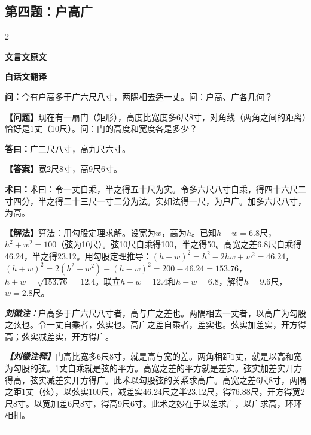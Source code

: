 \documentclass[10pt,a4paper]{article}
\newcommand{\wen}[1]{\textbf{\color{problemcolor}问：}#1\par}
\newcommand{\da}[1]{\textbf{答曰：}#1\par}
\newcommand{\shu}[1]{\textbf{术曰：}#1\par}
\newcommand{\liuhui}[1]{{\color{commentarycolor}\textit{\textbf{刘徽注：}}#1\par}}
\newcommand{\classicalheader}[1]{{\centering\large\bfseries\color{classicalcolor} #1\par\vspace{0.5em}}}
\newcommand{\wenmodern}[1]{\textbf{\color{moderncolor}【问题】}#1\par}
\newcommand{\damodern}[1]{\textbf{【答案】}#1\par}
\newcommand{\shumodern}[1]{\textbf{【解法】}#1\par}
\newcommand{\liuhuimodern}[1]{{\color{commentarycolor}\textit{\textbf{【刘徽注释】}}#1\par}}
\newcommand{\modernheader}[1]{{\centering\large\bfseries\color{moderncolor} #1\par\vspace{0.5em}}}
\newcommand{\problemsec}[1]{\subsection*{#1}}
\begin{document}
\problemsec{第四题：户高广}
\begin{paracol}{2}
\classicalheader{文言文原文}
\switchcolumn
\modernheader{白话文翻译}
\switchcolumn*

\wen{今有户高多于广六尺八寸，两隅相去适一丈。问：户高、广各几何？}

\switchcolumn

\wenmodern{现在有一扇门（矩形），高度比宽度多6尺8寸，对角线（两角之间的距离）恰好是1丈（10尺）。问：门的高度和宽度各是多少？}

\switchcolumn*

\da{广二尺八寸，高九尺六寸。}

\switchcolumn

\damodern{宽2尺8寸，高9尺6寸。}

\switchcolumn*

\shu{术曰：令一丈自乘，半之得五十尺为实。令多六尺八寸自乘，得四十六尺二寸四分，半之得二十三尺一寸二分为法。实如法得一尺，为户广。加多六尺八寸，为高。}

\switchcolumn

\shumodern{算法：用勾股定理求解。设宽为$w$，高为$h$。已知$h-w=6.8$尺，$h^2+w^2=100$（弦为10尺）。弦10尺自乘得100，半之得50。高宽之差6.8尺自乘得46.24，半之得23.12。用勾股定理推导：$(h-w)^2=h^2-2hw+w^2=46.24$，$(h+w)^2=2(h^2+w^2)-(h-w)^2=200-46.24=153.76$，$h+w=\sqrt{153.76}=12.4$。联立$h+w=12.4$和$h-w=6.8$，解得$h=9.6$尺，$w=2.8$尺。}

\switchcolumn*

\liuhui{户高多于广六尺八寸者，高与广之差也。两隅相去一丈者，以高广为勾股之弦也。令一丈自乘者，弦实也。高广之差自乘者，差实也。弦实加差实，开方得高；弦实减差实，开方得广。}

\switchcolumn

\liuhuimodern{门高比宽多6尺8寸，就是高与宽的差。两角相距1丈，就是以高和宽为勾股的弦。1丈自乘就是弦的平方。高宽之差的平方就是差实。弦实加差实开方得高，弦实减差实开方得广。此术以勾股弦的关系求高广。高宽之差6尺8寸，两隅之距1丈（弦），以弦实100尺，减差实46.24尺之半23.12尺，得76.88尺，开方得宽2尺8寸。以宽加差6尺8寸，得高9尺6寸。此术之妙在于以差求广，以广求高，环环相扣。}

\end{paracol}

\vspace{0.3cm}
\hrule
\vspace{0.3cm}
\end{document}
